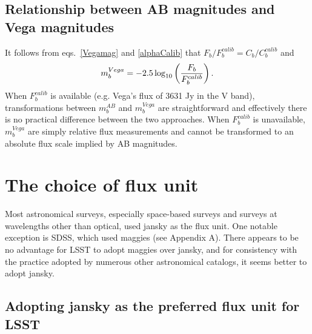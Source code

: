\documentclass[DM,lsstdraft,toc,usenatbib]{lsstdoc}
\begin{document}
\subsection{Relationship between AB magnitudes and Vega magnitudes} 

It follows from eqs.~\ref{Vegamag} and \ref{alphaCalib} that 
$F_b/F^{calib}_{b} = C_b / C_b^{calib}$ and 
\begin{equation}
\label{VegamagAB}
               m^{Vega}_b = -2.5\log_{10}\left({F_b \over F^{calib}_{b}}\right). 
\end{equation}
When $F^{calib}_{b}$ is available (e.g. Vega's flux of 3631 Jy in the V band), transformations between 
$m^{AB}_b$ and $m^{Vega}_b$ are straightforward and effectively there is no practical difference 
between the two approaches. When $F^{calib}_{b}$ is unavailable, $m^{Vega}_b$ are simply relative flux measurements
and cannot be transformed to an absolute flux scale implied by AB magnitudes. 


\section{The choice of flux unit}  

Most astronomical surveys, especially space-based surveys and surveys
at wavelengths other than optical, used jansky as the flux unit.  One notable
exception is SDSS, which used maggies (see Appendix A). There appears to be
no advantage for LSST to adopt maggies over jansky, and for consistency
with the practice adopted by numerous other astronomical catalogs, it seems
better to adopt jansky. 


\subsection{Adopting jansky as the preferred flux unit for LSST  \label{sec:Jy}} 
\end{document}
